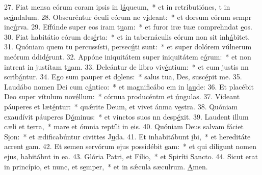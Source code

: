 27. Fiat mensa eórum coram ipsis in l\uline{á}queum,~* et in retributiónes, t in sc\uline{á}ndalum.
28. Obscuréntur óculi eórum ne v\uline{í}deant:~* et dorsum eórum sempr inc\uline{ú}rva.
29. Effúnde super eos iram t\uline{u}am:~* et furor iræ tuæ comprehndat \uline{e}os.
30. Fiat habitátio eórum des\uline{é}rta:~* et in tabernáculis eórum non sit  inh\uline{á}bitet.
31. Quóniam quem tu percussísti, persec\uline{ú}ti sunt:~* et super dolórem vúlnerum meórum ddid\uline{é}runt.
32. Appóne iniquitátem super iniquitátem e\uline{ó}rum:~* et non intrent in justítam t\uline{u}am.
33. Deleántur de libro viv\uline{é}ntium:~* et cum justis nn scrib\uline{á}ntur.
34. Ego sum pauper et d\uline{o}lens:~* salus tua, Des, susc\uline{é}pit me.
35. Laudábo nomen Dei cum c\uline{á}ntico:~* et magnificábo em in l\uline{au}de:
36. Et placébit Deo super vítulum nov\uline{é}llum:~* córnua producéntm et \uline{ú}ngulas.
37. Vídeant páuperes et læt\uline{é}ntur:~* quǽrite Deum, et vivet ánma v\uline{e}stra.
38. Quóniam exaudívit páuperes D\uline{ó}minus:~* et vinctos suos nn desp\uline{é}xit.
39. Laudent illum cæli et t\uline{e}rra,~* mare et ómnia reptíli in \uline{e}is.
40. Quóniam Deus salvam fáciet S\uline{i}on:~* et ædificabúntur civittes J\uline{u}da.
41. Et inhabitábunt \uline{i}bi,~* et hereditáte acrent \uline{e}am.
42. Et semen servórum ejus possidébit \uline{e}am:~* et qui díligunt nomen ejus, habitábnt in \uline{e}a.
43. Glória Patri, et F\uline{í}lio,~* et Spiríti S\uline{a}ncto.
44. Sicut erat in princípio, et nunc, et s\uline{e}mper,~* et in sǽcula sæculrum. \uline{A}men.
